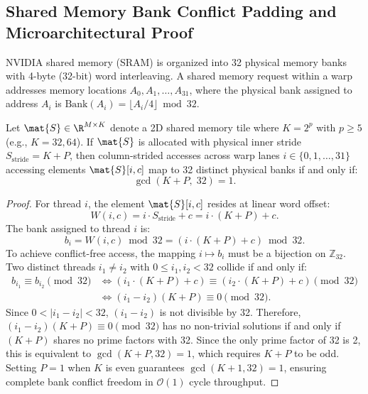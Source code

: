 \subsection{Shared Memory Bank Conflict Padding and Microarchitectural Proof}
\label{subsec:appendix_bank_padding_proof}

NVIDIA shared memory (SRAM) is organized into 32 physical memory banks with 4-byte (32-bit) word interleaving. A shared memory request within a warp addresses memory locations $A_0, A_1, \dots, A_{31}$, where the physical bank assigned to address $A_i$ is $\text{Bank}(A_i) = \lfloor A_i / 4 \rfloor \bmod 32$.

\begin{theorem}
Let $\mat{S} \in \R^{M \times K}$ denote a 2D shared memory tile where $K = 2^p$ with $p \ge 5$ (e.g., $K=32, 64$). If $\mat{S}$ is allocated with physical inner stride $S_{\text{stride}} = K + P$, then column-strided accesses across warp lanes $i \in \{0, 1, \dots, 31\}$ accessing elements $\mat{S}[i, c]$ map to 32 distinct physical banks if and only if:
\begin{equation}
\gcd(K + P, \; 32) = 1.
\end{equation}
\end{theorem}

\begin{proof}
For thread $i$, the element $\mat{S}[i, c]$ resides at linear word offset:
\begin{equation}
W(i, c) = i \cdot S_{\text{stride}} + c = i \cdot (K + P) + c.
\end{equation}
The bank assigned to thread $i$ is:
\begin{equation}
b_i = W(i, c) \bmod 32 = (i \cdot (K + P) + c) \bmod 32.
\end{equation}
To achieve conflict-free access, the mapping $i \mapsto b_i$ must be a bijection on $\mathbb{Z}_{32}$. Two distinct threads $i_1 \neq i_2$ with $0 \le i_1, i_2 < 32$ collide if and only if:
\begin{align}
b_{i_1} \equiv b_{i_2} \pmod{32} &\iff (i_1 \cdot (K + P) + c) \equiv (i_2 \cdot (K + P) + c) \pmod{32} \\
&\iff (i_1 - i_2)(K + P) \equiv 0 \pmod{32}.
\end{align}
Since $0 < |i_1 - i_2| < 32$, $(i_1 - i_2)$ is not divisible by 32. Therefore, $(i_1 - i_2)(K + P) \equiv 0 \pmod{32}$ has no non-trivial solutions if and only if $(K + P)$ shares no prime factors with 32. Since the only prime factor of 32 is 2, this is equivalent to $\gcd(K + P, 32) = 1$, which requires $K + P$ to be odd. Setting $P = 1$ when $K$ is even guarantees $\gcd(K + 1, 32) = 1$, ensuring complete bank conflict freedom in $\mathcal{O}(1)$ cycle throughput.
\end{proof}
